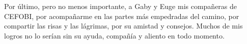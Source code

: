 Por último, pero no menos importante, a Gaby y Euge mis compañeras de CEFOBI, por acompañarme en las partes más empedradas del camino, por compartir las risas y las  lágrimas, por su amistad y consejos. Muchos  de  mis logros no lo serían sin su ayuda, compañía y aliento en todo momento.




